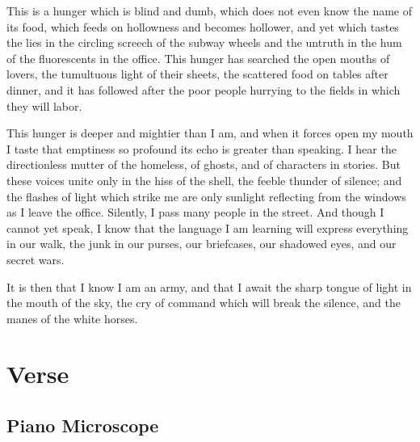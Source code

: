 \documentclass[english,11pt,letterpaper,onecolumn]{scrbook}
\begin{document}
	This is a hunger which is blind and dumb, which does not even know the name of its food, which feeds on hollowness and becomes hollower, and yet which tastes the lies in the circling screech of the subway wheels and the untruth in the hum of the fluorescents in the office.  This hunger has searched the open mouths of lovers, the tumultuous light of their sheets, the scattered food on tables after dinner, and it has followed after the poor people hurrying to the fields in which they will labor.

	This hunger is deeper and mightier than I am, and when it forces open my mouth I taste that emptiness so profound its echo is greater than speaking.  I hear the directionless mutter of the homeless, of ghosts, and of characters in stories.  But these voices unite only in the hiss of the shell, the feeble thunder of silence; and the flashes of light which strike me are only sunlight reflecting from the windows as I leave the office.  Silently, I pass many people in the street.  And though I cannot yet speak, I know that the language I am learning will express everything in our walk, the junk in our purses, our briefcases, our shadowed eyes, and our secret wars.

	It is then that I know I am an army, and that I await the sharp tongue of light in the mouth of the sky, the cry of command which will break the silence, and the manes of the white horses.


\chapter{Verse}

\newpage
\section{Piano Microscope}
\end{document}
